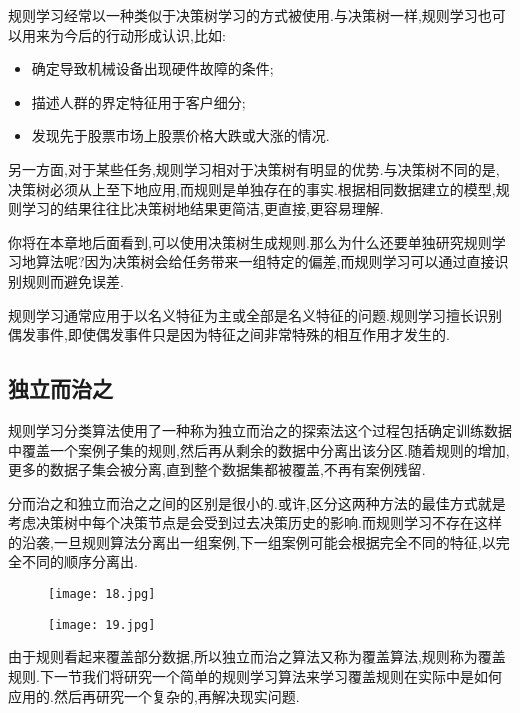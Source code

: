 \documentclass[11pt,a4paper,oneside]{book}
\begin{document}
规则学习经常以一种类似于决策树学习的方式被使用.与决策树一样,规则学习也可以用来为今后的行动形成认识,比如:
\begin{itemize}
	\item 确定导致机械设备出现硬件故障的条件;
	\item 描述人群的界定特征用于客户细分;
	\item 发现先于股票市场上股票价格大跌或大涨的情况.
\end{itemize}

另一方面,对于某些任务,规则学习相对于决策树有明显的优势.与决策树不同的是,决策树必须从上至下地应用,而规则是单独存在的事实.根据相同数据建立的模型,规则学习的结果往往比决策树地结果更简洁,更直接,更容易理解.

\begin{tcolorbox}[colback=pink!10!white,colframe=pink!100!black]
你将在本章地后面看到,可以使用决策树生成规则.那么为什么还要单独研究规则学习地算法呢?因为决策树会给任务带来一组特定的偏差,而规则学习可以通过直接识别规则而避免误差.
\end{tcolorbox}

规则学习通常应用于以名义特征为主或全部是名义特征的问题.规则学习擅长识别偶发事件,即使偶发事件只是因为特征之间非常特殊的相互作用才发生的.

\subsection{独立而治之}
规则学习分类算法使用了一种称为独立而治之的探索法这个过程包括确定训练数据中覆盖一个案例子集的规则,然后再从剩余的数据中分离出该分区.随着规则的增加,更多的数据子集会被分离,直到整个数据集都被覆盖,不再有案例残留.

\begin{tcolorbox}[colback=pink!10!white,colframe=pink!100!black]
分而治之和独立而治之之间的区别是很小的.或许,区分这两种方法的最佳方式就是考虑决策树中每个决策节点是会受到过去决策历史的影响.而规则学习不存在这样的沿袭,一旦规则算法分离出一组案例,下一组案例可能会根据完全不同的特征,以完全不同的顺序分离出.
\end{tcolorbox}
\begin{figure}[H]
	\centering
	\texttt{[image: 18.jpg]}
\end{figure}
\begin{figure}[H]
	\centering
	\texttt{[image: 19.jpg]}
\end{figure}
由于规则看起来覆盖部分数据,所以独立而治之算法又称为覆盖算法,规则称为覆盖规则.下一节我们将研究一个简单的规则学习算法来学习覆盖规则在实际中是如何应用的.然后再研究一个复杂的,再解决现实问题.
\end{document}
